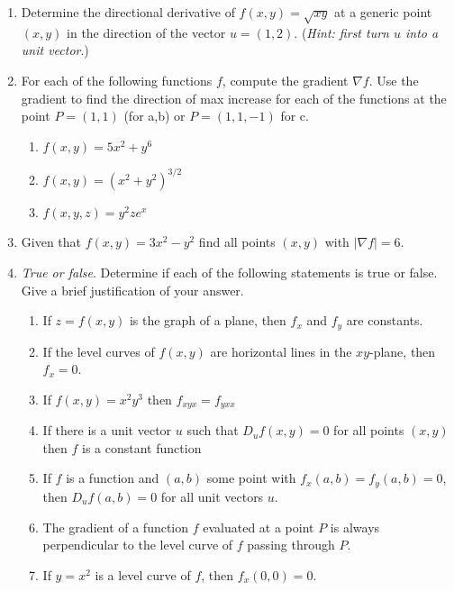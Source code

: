 \documentclass[12pt]{article}
\numberwithin{equation}{subsection}
\numberwithin{figure}{subsection}
\theoremstyle{note}
\begin{document}
{\begin{enumerate}[label=\arabic*.]
\begin{enumerate}
	\item $f(x,y)=\cos(2x+3y)$, $P=(3,-2)$, $u=(3/5,4/5)$
	\item $f(x,y)=e^{xy^2}$, $P=(0,1)$, $u=(-1/2,\sqrt{3}/2)$
	\item $f(x,y,z)=\ln(xz+y)$, $P=(1,0,\pi)$, $u=(1/\sqrt{2}, 1/\sqrt{2},0)$
\end{enumerate}

\item Determine the directional derivative of $f(x,y)=\sqrt{xy}$ at a generic point $(x,y)$ in the direction of the vector $u=(1,2)$. (\textit{Hint: first turn $u$ into a unit vector}.)

\item For each of the following functions $f$, compute the gradient $\nabla f$. Use the gradient to find the direction of max increase for each of the functions at the point $P=(1,1)$ (for a,b) or $P=(1,1,-1)$ for c.

\begin{enumerate}
	\item $f(x,y)=5x^2+y^6$
	\item $f(x,y)=(x^2+y^2)^{3/2}$
	\item $f(x,y,z)=y^2z e^x$
\end{enumerate}

\item Given that $f(x,y)=3x^2-y^2$ find all points $(x,y)$ with $|\nabla f|=6$. 


\item \textit{True or false}. Determine if each of the following statements is true or false. Give a brief justification of your answer.

\begin{enumerate}
	\item If $z=f(x,y)$ is the graph of a plane, then $f_x$ and $f_y$ are constants. 
	\item If the level curves of $f(x,y)$ are horizontal lines in the $xy$-plane, then $f_{x}=0$.
	\item If $f(x,y)=x^2y^3$ then $f_{xyx}=f_{yxx}$
	\item If there is a unit vector $u$ such that $D_u f(x,y)=0$ for all points $(x,y)$ then $f$ is a constant function
	\item If $f$ is a function and $(a,b)$ some point with $f_x(a,b)=f_y(a,b)=0$, then $D_uf(a,b)=0$ for all unit vectors $u$.
	\item The gradient of a function $f$ evaluated at a point $P$ is always perpendicular to the level curve of $f$ passing through $P$.
	\item If $y=x^2$ is a level curve of $f$, then $f_x(0,0)=0$. 
\end{enumerate}
\end{enumerate}

}
\end{document}
